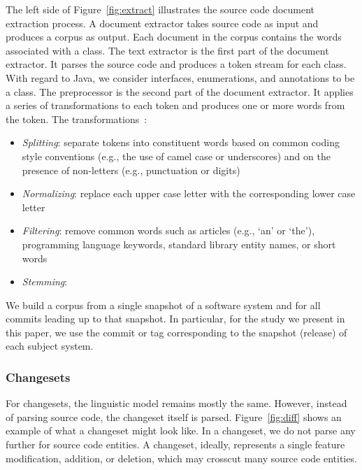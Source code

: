 The left side of Figure~\ref{fig:extract} illustrates the source code
document extraction process.
A document extractor takes source code as input and produces a corpus as
output.
Each document in the corpus contains the words associated with a class.
The text extractor is the first part of the document extractor.
It parses the source code and produces a token stream for each class.
With regard to Java, we consider interfaces, enumerations, and
annotations to be a class.
The preprocessor is the second part of the document extractor.
It applies a series of transformations to each token and
produces one or more words from the token.
The transformations~\cite{Marcus-etal:2004,Marcus-Menzies:2010}: %
\begin{itemize}
    \item {\it Splitting}: separate tokens into constituent words
        based on common coding style conventions (e.g., the use of camel case or underscores)
        and on the presence of non-letters (e.g., punctuation or digits)
    \item {\it Normalizing}: replace each upper case letter with the corresponding
        lower case letter
    \item {\it Filtering}: remove common words such as articles (e.g., `an' or `the'),
        programming language keywords, standard library entity names, or short words
    \item {\it Stemming}:  
\end{itemize}
We build a corpus from a single snapshot of a software system and for all
commits leading up to that snapshot.
In particular, for the study we present in this paper,
we use the commit or tag corresponding to the snapshot (release) of each subject system.

\subsubsection{Changesets}

For changesets, the linguistic model remains mostly the same. However,
instead of parsing source code, the changeset itself is parsed.
Figure~\ref{fig:diff} shows an example of what a changeset might look
like.
In a changeset, we do not parse any further for source code entities.
A changeset, ideally, represents a single feature modification, addition, or deletion, which may crosscut many source code entities.


